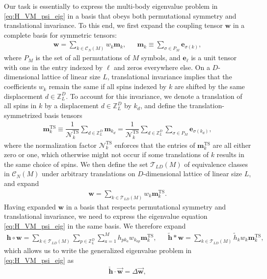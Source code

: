 \documentclass[nofootinbib,notitlepage,11pt]{revtex4-2}
\renewcommand{\t}{\text} %
\newcommand{\f}[2]{\dfrac{#1}{#2}} %
\newcommand{\p}[1]{\left(#1\right)} %
\renewcommand{\c}{\cdot} %
\newcommand{\m}{\bm} %
\renewcommand{\v}{\vec} %
\newcommand{\1}{\mathds{1}}
\newcommand{\C}{\mathcal{C}}
\newcommand{\N}{\mathcal{N}}
\newcommand{\T}{\mathcal{T}}
\newcommand{\ZZ}{\mathbb{Z}}
\begin{document}
Our task is essentially to express the multi-body eigenvalue problem
in \eqref{eq:H_VM_psi_eig} in a basis that obeys both permutational
symmetry and translational invariance.  To this end, we first expand
the coupling tensor $\m w$ in a complete basis for symmetric tensors:
\begin{align}
  \m w = \sum_{k\in\C_N\p{M}} w_k \m m_k,
  &&
  \m m_k \equiv \sum_{\sigma\in P_M} \m e_{\sigma\p{k}},
  \label{eq:sym_tensor}
\end{align}
where $P_M$ is the set of all permutations of $M$ symbols, and
$\m e_\ell$ is a unit tensor with one in the entry indexed by $\ell$
and zeros everywhere else.  On a $D$-dimensional lattice of linear
size $L$, translational invariance implies that the coefficients $w_k$
remain the same if all spins indexed by $k$ are shifted by the same
displacement $d\in\ZZ_L^D$.  To account for this invariance, we denote
a translation of all spins in $k$ by a displacement $d\in\ZZ_L^D$ by
$k_d$, and define the translation-symmetrized basis tensors
\begin{align}
  \m m_k^{\t{TS}}
  \equiv \f1{\N_k^{\t{TS}}} \sum_{d\in\ZZ_L^D} \m m_{k_d}
  = \f1{\N_k^{\t{TS}}} \sum_{d\in\ZZ_L^D} \sum_{\sigma\in P_M}
  \m e_{\sigma(k_d)},
\end{align}
where the normalization factor $\N_k^{\t{TS}}$ enforces that the
entries of $\m m_k^{\t{TS}}$ are all either zero or one, which
otherwise might not occur if some translations of $k$ results in the
same choice of spins.  We then define the set $\T_{LD}\p{M}$ of
equivalence classes in $\C_N\p{M}$ under arbitrary translations on
$D$-dimensional lattice of linear size $L$, and expand
\begin{align}
  \m w = \sum_{k\in\T_{LD}\p{M}} w_k \m m_k^{\t{TS}}.
  \label{eq:sym_shift_tensor}
\end{align}
Having expanded $\m w$ in a basis that respects permutational symmetry
and translational invariance, we need to express the eigenvalue
equation \eqref{eq:H_VM_psi_eig} in the same basis.  We therefore
expand
\begin{align}
  \m h\circ\m w
  = \sum_{k\in\T_{LD}\p{M}} \sum_{p\in\ZZ_L^D} \sum_{a=1}^M
  h_{pk_a} w_{k_{ap}} \m m_k^{\t{TS}},
  &&
  \tilde{\m h} * \m w = \sum_{k\in\T_{LD}\p{M}}
  \tilde h_k w_k \m m_k^{\t{TS}},
\end{align}
which allows us to write the generalized eigenvalue problem in
\eqref{eq:H_VM_psi_eig} as
\begin{align}
  \check{\m h}\c\v{\m w} = \Delta\v{\m w},
\end{align}
\end{document}
